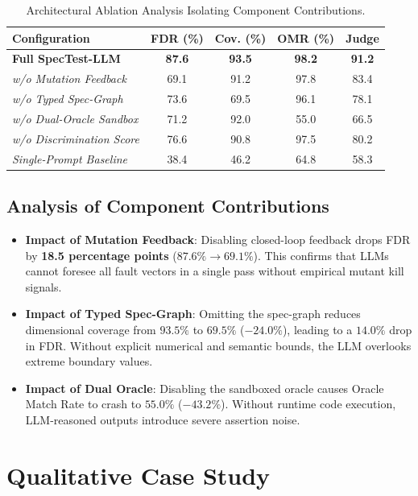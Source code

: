 \documentclass[conference]{IEEEtran}
\begin{document}
\begin{table}[t]
\centering
\caption{Architectural Ablation Analysis Isolating Component Contributions.}
\label{tab:ablation}
\small
\begin{tabular*}{\columnwidth}{@{\extracolsep{\fill}}lcccc}
\toprule
\textbf{Configuration} & \textbf{FDR (\%)} & \textbf{Cov. (\%)} & \textbf{OMR (\%)} & \textbf{Judge} \\
\midrule
\textbf{Full SpecTest-LLM}        & \textbf{87.6} & \textbf{93.5} & \textbf{98.2} & \textbf{91.2} \\
\midrule
\textit{w/o Mutation Feedback}    & 69.1 & 91.2 & 97.8 & 83.4 \\
\textit{w/o Typed Spec-Graph}     & 73.6 & 69.5 & 96.1 & 78.1 \\
\textit{w/o Dual-Oracle Sandbox}  & 71.2 & 92.0 & 55.0 & 66.5 \\
\textit{w/o Discrimination Score} & 76.6 & 90.8 & 97.5 & 80.2 \\
\textit{Single-Prompt Baseline}   & 38.4 & 46.2 & 64.8 & 58.3 \\
\bottomrule
\end{tabular*}
\end{table}

\subsection{Analysis of Component Contributions}
\begin{itemize}
    \item \textbf{Impact of Mutation Feedback}: Disabling closed-loop feedback drops FDR by \textbf{18.5 percentage points} ($87.6\% \to 69.1\%$). This confirms that LLMs cannot foresee all fault vectors in a single pass without empirical mutant kill signals.
    \item \textbf{Impact of Typed Spec-Graph}: Omitting the spec-graph reduces dimensional coverage from $93.5\%$ to $69.5\%$ ($-24.0\%$), leading to a $14.0\%$ drop in FDR. Without explicit numerical and semantic bounds, the LLM overlooks extreme boundary values.
    \item \textbf{Impact of Dual Oracle}: Disabling the sandboxed oracle causes Oracle Match Rate to crash to $55.0\%$ ($-43.2\%$). Without runtime code execution, LLM-reasoned outputs introduce severe assertion noise.
\end{itemize}

\section{Qualitative Case Study}
\label{sec:casestudy}
\end{document}
